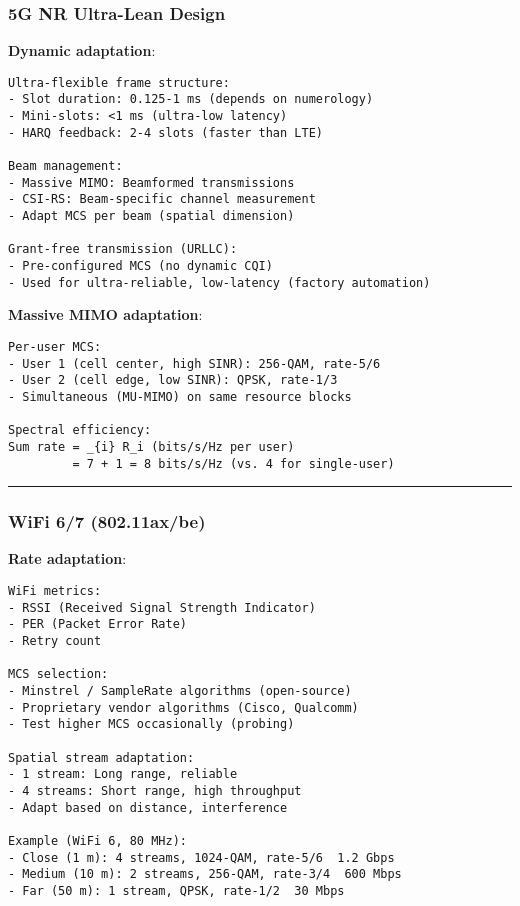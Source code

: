 \subsubsection{5G NR Ultra-Lean Design}\label{g-nr-ultra-lean-design}

\textbf{Dynamic adaptation}:

\begin{verbatim}
Ultra-flexible frame structure:
- Slot duration: 0.125-1 ms (depends on numerology)
- Mini-slots: <1 ms (ultra-low latency)
- HARQ feedback: 2-4 slots (faster than LTE)

Beam management:
- Massive MIMO: Beamformed transmissions
- CSI-RS: Beam-specific channel measurement
- Adapt MCS per beam (spatial dimension)

Grant-free transmission (URLLC):
- Pre-configured MCS (no dynamic CQI)
- Used for ultra-reliable, low-latency (factory automation)
\end{verbatim}

\textbf{Massive MIMO adaptation}:

\begin{verbatim}
Per-user MCS:
- User 1 (cell center, high SINR): 256-QAM, rate-5/6
- User 2 (cell edge, low SINR): QPSK, rate-1/3
- Simultaneous (MU-MIMO) on same resource blocks

Spectral efficiency:
Sum rate = _{i} R_i (bits/s/Hz per user)
         = 7 + 1 = 8 bits/s/Hz (vs. 4 for single-user)
\end{verbatim}

\begin{center}\rule{0.5\linewidth}{0.5pt}\end{center}

\subsubsection{WiFi 6/7 (802.11ax/be)}\label{wifi-67-802.11axbe}

\textbf{Rate adaptation}:

\begin{verbatim}
WiFi metrics:
- RSSI (Received Signal Strength Indicator)
- PER (Packet Error Rate)
- Retry count

MCS selection:
- Minstrel / SampleRate algorithms (open-source)
- Proprietary vendor algorithms (Cisco, Qualcomm)
- Test higher MCS occasionally (probing)

Spatial stream adaptation:
- 1 stream: Long range, reliable
- 4 streams: Short range, high throughput
- Adapt based on distance, interference

Example (WiFi 6, 80 MHz):
- Close (1 m): 4 streams, 1024-QAM, rate-5/6  1.2 Gbps
- Medium (10 m): 2 streams, 256-QAM, rate-3/4  600 Mbps
- Far (50 m): 1 stream, QPSK, rate-1/2  30 Mbps
\end{verbatim}


